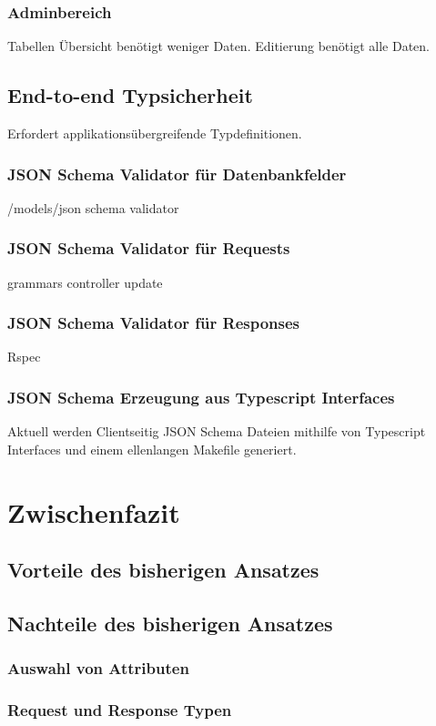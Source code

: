 \subsection{Adminbereich}
Tabellen Übersicht benötigt weniger Daten. Editierung benötigt alle Daten.

\section{End-to-end Typsicherheit}
Erfordert applikationsübergreifende Typdefinitionen. 
\subsection{JSON Schema Validator für Datenbankfelder}
/models/json schema validator
\subsection{JSON Schema Validator für Requests}
grammars controller update
\subsection{JSON Schema Validator für Responses}
Rspec
\subsection{JSON Schema Erzeugung aus Typescript Interfaces}
Aktuell werden Clientseitig JSON Schema Dateien mithilfe von Typescript Interfaces und einem ellenlangen Makefile generiert.

\chapter{Zwischenfazit}
\section{Vorteile des bisherigen Ansatzes}
\section{Nachteile des bisherigen Ansatzes}
\subsection{Auswahl von Attributen}
\subsection{Request und Response Typen}
